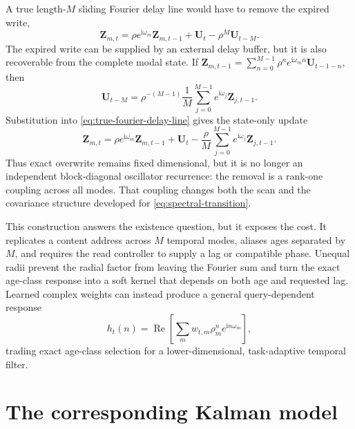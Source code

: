 \documentclass[11pt]{article}
\newcommand{\ve}[1]{\boldsymbol{#1}}
\DeclareMathOperator{\RePart}{Re}
\begin{document}
A true length-$M$ sliding Fourier delay line would have to remove the expired write,
\begin{equation}
  \ve{Z}_{m,t}
  =\rho e^{\mathrm{i}\omega_m}\ve{Z}_{m,t-1}
   +\ve{U}_t-\rho^M\ve{U}_{t-M}.
  \label{eq:true-fourier-delay-line}
\end{equation}
The expired write can be supplied by an external delay buffer, but it is also recoverable from
the complete modal state. If
$\ve{Z}_{m,t-1}=\sum_{n=0}^{M-1}\rho^n e^{\mathrm{i}\omega_m n}\ve{U}_{t-1-n}$, then
\begin{equation}
  \ve{U}_{t-M}
  =\rho^{-(M-1)}\frac{1}{M}\sum_{j=0}^{M-1}
   e^{\mathrm{i}\omega_j}\ve{Z}_{j,t-1}.
\end{equation}
Substitution into \eqref{eq:true-fourier-delay-line} gives the state-only update
\begin{equation}
  \ve{Z}_{m,t}
  =\rho e^{\mathrm{i}\omega_m}\ve{Z}_{m,t-1}+\ve{U}_t
   -\frac{\rho}{M}\sum_{j=0}^{M-1}
    e^{\mathrm{i}\omega_j}\ve{Z}_{j,t-1}.
  \label{eq:coupled-fourier-overwrite}
\end{equation}
Thus exact overwrite remains fixed dimensional, but it is no longer an independent
block-diagonal oscillator recurrence: the removal is a rank-one coupling across all modes.
That coupling changes both the scan and the covariance structure developed for
\eqref{eq:spectral-transition}.

This construction answers the existence question, but it exposes the cost. It replicates a
content address across $M$ temporal modes, aliases ages separated by $M$, and requires the
read controller to supply a lag or compatible phase. Unequal radii prevent the radial factor
from leaving the Fourier sum and turn the exact age-class response into a soft kernel that
depends on both age and requested lag. Learned complex weights can instead
produce a general query-dependent response
\begin{equation}
  h_t(n)
  =\RePart\!\left[
    \sum_m w_{t,m}\rho_m^n e^{\mathrm{i}n\omega_m}
  \right],
  \label{eq:learned-lag-kernel}
\end{equation}
trading exact age-class selection for a lower-dimensional, task-adaptive temporal filter.


\section{The corresponding Kalman model}
\end{document}
